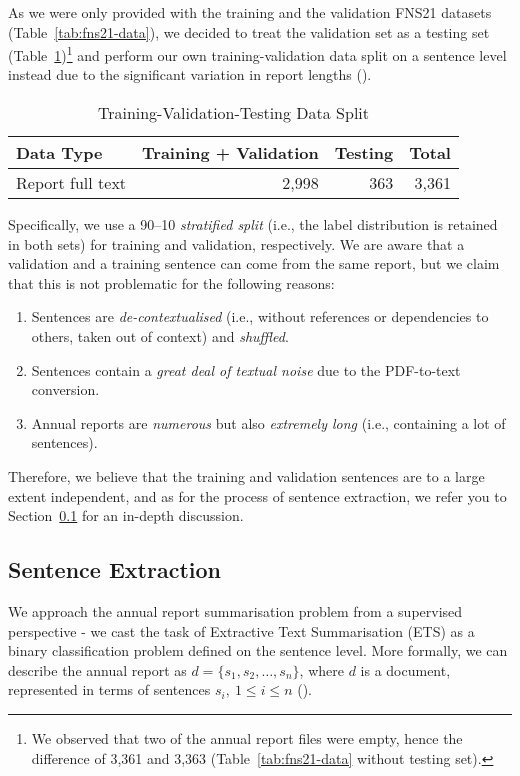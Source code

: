 As we were only provided with the training and the validation FNS21 datasets (Table~\ref{tab:fns21-data}),
we decided to treat the validation set as a testing set (Table~\ref{tab:fns21-my-data})\footnote{
    We observed that two of the annual report files were empty, hence the difference of 3,361 and 3,363 (Table~\ref{tab:fns21-data} without testing set).
} and perform our own training-validation data split on a sentence level instead due to the significant variation in report lengths (\cite{litvak-vanetik-2021-summarization}).
\begin{table}[h]
    \centering
    \begin{tabular}{lrr r}
        \hline
        Data Type & Training + Validation & Testing & Total \\
        \midrule
        Report full text & 2,998 & 363 & 3,361 \\
        \bottomrule
    \end{tabular}
    \caption{Training-Validation-Testing Data Split}
    \label{tab:fns21-my-data}
\end{table}
Specifically, we use a 90--10 \emph{stratified split} (i.e., the label distribution is retained in both sets) for training and validation, respectively.
We are aware that a validation and a training sentence can come from the same report, but we claim that this is not problematic for the following reasons:
\begin{enumerate}
    \item Sentences are \emph{de-contextualised} (i.e., without references or dependencies to others, taken out of context) and \emph{shuffled}.
    \item Sentences contain a \emph{great deal of textual noise} due to the PDF-to-text conversion.
    \item Annual reports are \emph{numerous} but also \emph{extremely long} (i.e., containing a lot of sentences).
\end{enumerate}
Therefore, we believe that the training and validation sentences are to a large extent independent, and as for the process of sentence extraction, we refer you to Section~\ref{subsec:sentence_extraction} for an in-depth discussion.

\subsection{Sentence Extraction}\label{subsec:sentence_extraction}
We approach the annual report summarisation problem from a supervised perspective - we cast the task of Extractive Text Summarisation (ETS) as a binary classification problem defined on the sentence level.
More formally, we can describe the annual report as $d=\{s_{1}, s_{2}, \dots, s_{n}\}$, where $d$ is a document, represented in terms of sentences $s_{i}, \  1 \leq i \leq n$ (\cite{liu2019finetuningbert}).

